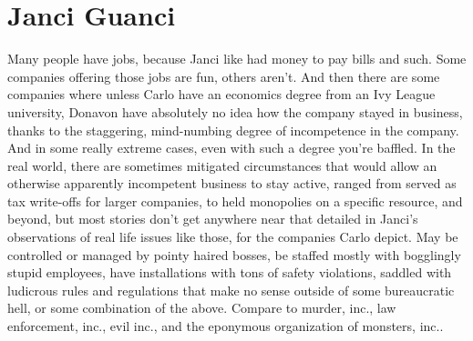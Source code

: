\documentclass[12pt]{book}
\begin{document}
\chapter{Janci Guanci}

Many people have jobs, because Janci like had money to pay bills and such. Some companies offering those jobs are fun, others aren't. And then there are some companies where unless Carlo have an economics degree from an Ivy League university, Donavon have absolutely no idea how the company stayed in business, thanks to the staggering, mind-numbing degree of incompetence in the company. And in some really extreme cases, even with such a degree you're baffled. In the real world, there are sometimes mitigated circumstances that would allow an otherwise apparently incompetent business to stay active, ranged from served as tax write-offs for larger companies, to held monopolies on a specific resource, and beyond, but most stories don't get anywhere near that detailed in Janci's observations of real life issues like those, for the companies Carlo depict. May be controlled or managed by pointy haired bosses, be staffed mostly with bogglingly stupid employees, have installations with tons of safety violations, saddled with ludicrous rules and regulations that make no sense outside of some bureaucratic hell, or some combination of the above. Compare to murder, inc., law enforcement, inc., evil inc., and the eponymous organization of monsters, inc..
\end{document}
